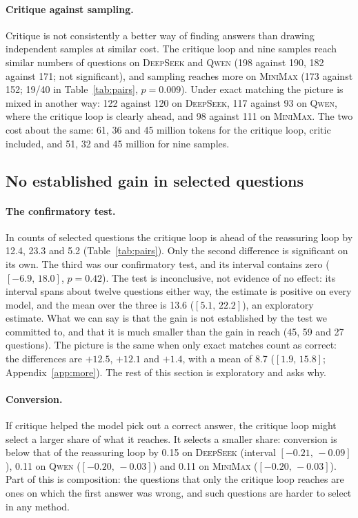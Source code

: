 \documentclass[11pt]{article}
\newcommand{\ds}{\textsc{DeepSeek}}
\newcommand{\qw}{\textsc{Qwen}}
\newcommand{\mm}{\textsc{MiniMax}}
\newcommand{\ci}[2]{$[#1,\,#2]$}
\begin{document}
\paragraph{Critique against sampling.}
Critique is not consistently a better way of finding answers than drawing independent samples at similar cost.
The critique loop and nine samples reach similar numbers of questions on \ds{} and \qw{} (198 against 190, 182 against 171; not significant), and sampling reaches more on \mm{} (173 against 152; 19/40 in Table~\ref{tab:pairs}, $p=0.009$).
Under exact matching the picture is mixed in another way: 122 against 120 on \ds, 117 against 93 on \qw, where the critique loop is clearly ahead, and 98 against 111 on \mm.
The two cost about the same: 61, 36 and 45 million tokens for the critique loop, critic included, and 51, 32 and 45 million for nine samples.


\subsection{No established gain in selected questions}
\label{sec:select}

\paragraph{The confirmatory test.}
In counts of selected questions the critique loop is ahead of the reassuring loop by 12.4, 23.3 and 5.2 (Table~\ref{tab:pairs}).
Only the second difference is significant on its own.
The third was our confirmatory test, and its interval contains zero (\ci{-6.9}{18.0}, $p=0.42$).
The test is inconclusive, not evidence of no effect: its interval spans about twelve questions either way, the estimate is positive on every model, and the mean over the three is 13.6 (\ci{5.1}{22.2}), an exploratory estimate.
What we can say is that the gain is not established by the test we committed to, and that it is much smaller than the gain in reach (45, 59 and 27 questions).
The picture is the same when only exact matches count as correct: the differences are $+12.5$, $+12.1$ and $+1.4$, with a mean of 8.7 (\ci{1.9}{15.8}; Appendix~\ref{app:more}).
The rest of this section is exploratory and asks why.

\paragraph{Conversion.}
If critique helped the model pick out a correct answer, the critique loop might select a larger share of what it reaches.
It selects a smaller share: conversion is below that of the reassuring loop by 0.15 on \ds{} (interval \ci{-0.21}{-0.09}), 0.11 on \qw{} (\ci{-0.20}{-0.03}) and 0.11 on \mm{} (\ci{-0.20}{-0.03}).
Part of this is composition: the questions that only the critique loop reaches are ones on which the first answer was wrong, and such questions are harder to select in any method.
\end{document}
